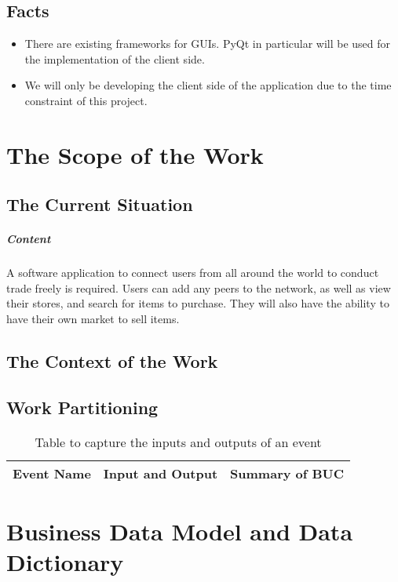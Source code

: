 \documentclass{article}
\begin{document}
\subsection{Facts}
\begin{itemize}
	
\item
There are existing frameworks for GUIs. PyQt in particular will be used for the implementation of the client side. 
\item
We will only be developing the client side of the application due to the time constraint of this project.
	
\end{itemize} 

\section{The Scope of the Work}
\subsection{The Current Situation}
\subparagraph{Content}
A software application to connect users from all around the world to conduct trade freely is required. Users can add any peers to the network, as well as view their stores, and search for items to purchase. They will also have the ability to have their own market to sell items.

\subsection{The Context of the Work}


\subsection{Work Partitioning}

\begin{table}[h!]
\centering
\begin{tabular}{||c c c ||}
 \hline
 \textbf {Event Name} & \textbf{Input and Output} & \textbf{Summary of BUC} \\ [0.5ex]
 \hline
\end{tabular}
\caption{Table to capture the inputs and outputs of an event}
\label{table:2}
\end{table}

\section{Business Data Model and Data Dictionary}
\end{document}
